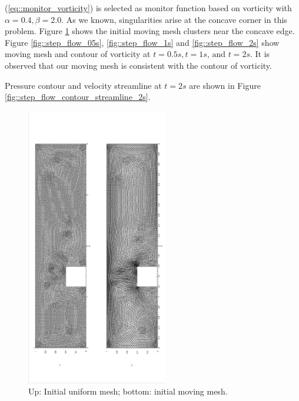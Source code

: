 \documentclass[a4paper, 11pt]{article}
\begin{document}
      (\ref{eq::monitor_vorticity}) is selected as monitor function
      based on vorticity with $\alpha = 0.4, \beta = 2.0$. As we
      known, singularities arise at the concave corner in this
      problem. Figure \ref{fig::step_initial_mesh} shows the initial
      moving mesh clusters near the concave edge. Figure
      \ref{fig::step_flow_05s}, \ref{fig::step_flow_1s} and
      \ref{fig::step_flow_2s} show moving mesh and contour of
      vorticity at $t = 0.5s, t = 1s \text{, and } t = 2s$. It is
      observed that our moving mesh is consistent with the contour of
      vorticity.

      Pressure contour and velocity streamline at $t = 2s$ are shown
      in Figure \ref{fig::step_flow_contour_streamline_2s}.      
       
      \begin{figure}[!htbp]
        \begin{center}
        \includegraphics[width = 0.55\textwidth, angle = -90]{picture/step_flow_data/initial_mesh40_001.eps}
        \caption{\small Up: Initial uniform mesh; bottom: initial moving mesh.}
        \label{fig::step_initial_mesh}
        \end{center}
      \end{figure}
\end{document}
